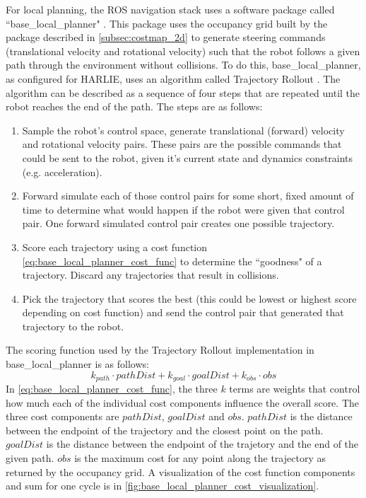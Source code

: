 For local planning, the ROS navigation stack uses a software package called ``base\_local\_planner" . This package uses the occupancy grid built by the package described in \autoref{subsec:costmap_2d} to generate steering commands (translational velocity and rotational velocity) such that the robot follows a given path through the environment without collisions. To do this, base\_local\_planner, as configured for HARLIE, uses an algorithm called Trajectory Rollout \autocite{Gerkey_Konolige_2008}. The algorithm can be described as a sequence of four steps that are repeated until the robot reaches the end of the path. The steps are as follows:
\begin{enumerate}
\item Sample the robot's control space, generate translational (forward) velocity and rotational velocity pairs. These pairs are the possible commands that could be sent to the robot, given it's current state and dynamics constraints (e.g. acceleration).
\item Forward simulate each of those control pairs for some short, fixed amount of time to determine what would happen if the robot were given that control pair. One forward simulated control pair creates one possible trajectory.
\item Score each trajectory using a cost function \eqref{eq:base_local_planner_cost_func} to determine the ``goodness" of a trajectory. Discard any trajectories that result in collisions.
\item Pick the trajectory that scores the best (this could be lowest or highest score depending on cost function) and send the control pair that generated that trajectory to the robot.
\end{enumerate}

The scoring function used by the Trajectory Rollout implementation in base\_local\_planner is as follows:
\begin{equation}
	k_{path} \cdot pathDist + k_{goal} \cdot goalDist + k_{obs} \cdot obs \label{eq:base_local_planner_cost_func}
\end{equation}
In \eqref{eq:base_local_planner_cost_func}, the three $k$ terms are weights that control how much each of the individual cost components influence the overall score. The three cost components are $pathDist$, $goalDist$ and $obs$. $pathDist$ is the distance between the endpoint of the trajectory and the closest point on the path. $goalDist$ is the distance between the endpoint of the trajetory and the end of the given path. $obs$ is the maximum cost for any point along the trajectory as returned by the occupancy grid. A visualization of the cost function components and sum for one cycle is in \autoref{fig:base_local_planner_cost_visualization}.

